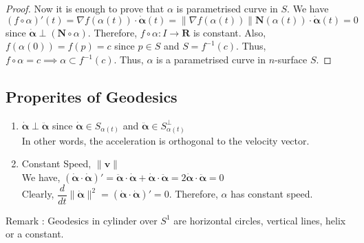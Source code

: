\begin{proof}
	Now it is enough to prove that $\alpha$ is parametrised curve in $S$.
	We have $(f \circ \alpha)'(t) = \nabla f(\alpha(t)) \cdot \dot{\boldsymbol{\alpha}}(t) = \| \nabla f(\alpha(t)) \| \mathbf{N}(\alpha(t)) \cdot \dot{\boldsymbol{\alpha}}(t) = 0$ since $\dot{\boldsymbol{\alpha}} \perp (\mathbf{N} \circ \alpha)$.
	Therefore, $f \circ \alpha : I \to \mathbf{R}$ is constant.
	Also, $f(\alpha(0)) = f(p) = c$ since $p \in S$ and $S = f^{-1}(c)$.
	Thus, $f \circ \alpha = c \implies \alpha \subset f^{-1}(c)$.
	Thus, $\alpha$ is a parametrised curve in $n$-surface $S$.
\end{proof}

\subsection{Properites of Geodesics}
\begin{enumerate}
	\item $\dot{\boldsymbol{\alpha}} \perp \ddot{\boldsymbol{\alpha}}$ since $\dot{\boldsymbol{\alpha}} \in S_{\alpha(t)}$ and $\ddot{\boldsymbol{\alpha}} \in S_{\alpha(t)}^\perp$\\
		In other words, the acceleration is orthogonal to the velocity vector.
	\item Constant Speed, $\| \mathbf{v} \|$\\
		We have, $(\dot{\boldsymbol{\alpha}} \cdot \dot{\boldsymbol{\alpha}})' =  \ddot{\boldsymbol{\alpha}} \cdot \dot{\boldsymbol{\alpha}} + \dot{\boldsymbol{\alpha}} \cdot \ddot{\boldsymbol{\alpha}} = 2\dot{\boldsymbol{\alpha}} \cdot \ddot{\boldsymbol{\alpha}} = 0$\\
		Clearly, $\dfrac{d}{dt} \|\dot{\boldsymbol{\alpha}} \|^2 =  \left( \dot{\boldsymbol{\alpha}} \cdot \dot{\boldsymbol{\alpha}} \right)' = 0$.
		Therefore, $\alpha$ has constant speed.
\end{enumerate} 

Remark :  Geodesics in cylinder over $S^1$ are horizontal circles, vertical lines, helix or a constant. 

